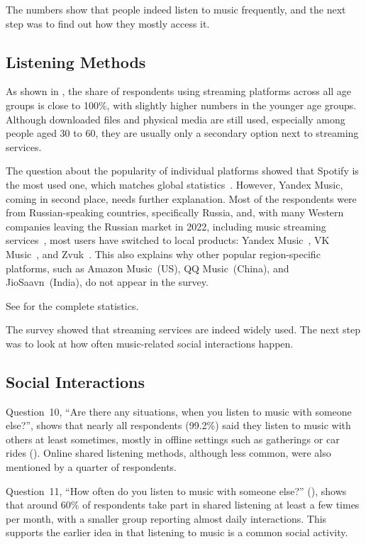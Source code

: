 The numbers show that people indeed listen to music frequently, and
the next step was to find out how they mostly access it.

\subsection{Listening Methods}
As shown in , the share of respondents using streaming
platforms across all age groups is close to 100\%, with slightly higher
numbers in the younger age groups.
Although downloaded files and physical media are still used,
especially among people aged 30 to 60, they are usually only a secondary option next to streaming services.

The question about the popularity of individual platforms showed that Spotify is the most used one,
which matches global statistics~\parencite{spotifypopularity}.
However, Yandex Music, coming in second place, needs further explanation.
Most of the respondents were from Russian-speaking countries, specifically Russia, and,
with many Western companies leaving the Russian market in 2022, including music streaming services~\parencite{spotify_russia_exit},
most users have switched to local products: Yandex Music~\parencite{yandex_music}, VK Music~\parencite{vk_music}, and
Zvuk~\parencite{zvuk}.
This also explains why other popular region-specific platforms,
such as Amazon Music~(US), QQ Music~(China),
and JioSaavn~(India), do not appear in the survey.

See  for the complete statistics.

The survey showed that streaming services are indeed widely used.
The next step was to look at how often music-related social interactions happen.

\subsection{Social Interactions}
Question~10, ``Are there any situations, when you listen to music with someone else?'',
shows that nearly all respondents (99.2\%) said they listen to music with
others at least sometimes, mostly in offline settings such as gatherings
or car rides ().
Online shared listening methods, although less common, were also mentioned by a quarter
of respondents.

Question~11, ``How often do you listen to music with someone else?''
(), shows that around 60\%
of respondents take part in shared listening at least a few times per
month, with a smaller group reporting almost daily interactions.
This supports the earlier idea in 
that listening to music is a common social activity.

